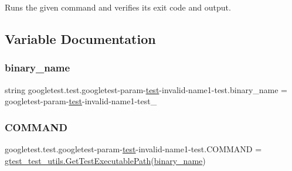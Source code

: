 \begin{DoxyVerb}Runs the given command and verifies its exit code and output.\end{DoxyVerb}
 

\subsection{Variable Documentation}
\mbox{\label{namespacegoogletest_1_1test_1_1googletest-param-test-invalid-name1-test_a8d28c943801f6ef770caaca166552b4f}} 
\subsubsection{\texorpdfstring{binary\_name}{binary\_name}}
{\footnotesize\ttfamily string googletest.\+test.\+googletest-\/param-\/\mbox{\hyperlink{_mutual_8h_a707ee03719e99670bf6cfdfd897b8456}{test}}-\/invalid-\/name1-\/test.\+binary\+\_\+name = \textquotesingle{}googletest-\/param-\/\mbox{\hyperlink{_mutual_8h_a707ee03719e99670bf6cfdfd897b8456}{test}}-\/invalid-\/name1-\/test\+\_\+\textquotesingle{}}

\mbox{\label{namespacegoogletest_1_1test_1_1googletest-param-test-invalid-name1-test_ab8f17c553a432a64a5266b13d71d7da5}} 
\subsubsection{\texorpdfstring{COMMAND}{COMMAND}}
{\footnotesize\ttfamily googletest.\+test.\+googletest-\/param-\/\mbox{\hyperlink{_mutual_8h_a707ee03719e99670bf6cfdfd897b8456}{test}}-\/invalid-\/name1-\/test.\+C\+O\+M\+M\+A\+ND = \mbox{\hyperlink{namespacegoogletest_1_1test_1_1gtest__test__utils_ac9af888c702350aac56b154a6af34098}{gtest\+\_\+test\+\_\+utils.\+Get\+Test\+Executable\+Path}}(\mbox{\hyperlink{namespacegoogletest_1_1test_1_1googletest-param-test-invalid-name1-test_a8d28c943801f6ef770caaca166552b4f}{binary\+\_\+name}})}

